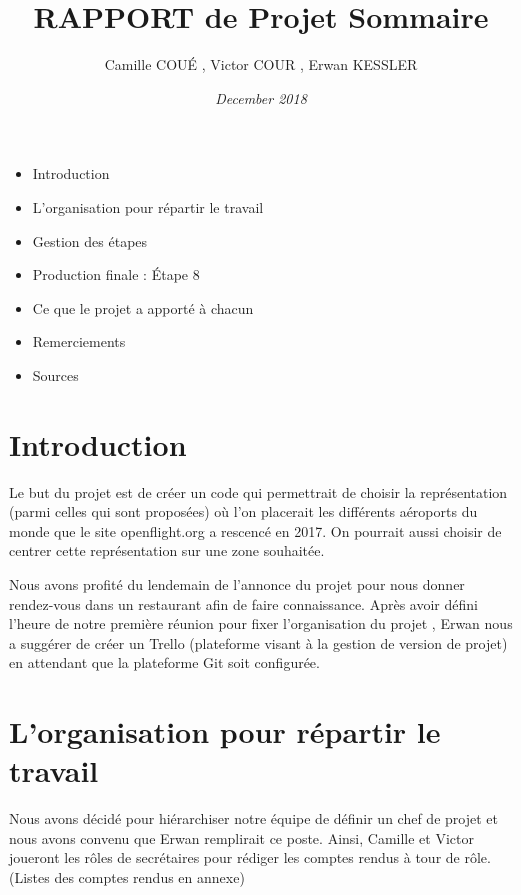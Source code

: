 \documentclass{article}
\title{\bf \color{orange} RAPPORT de Projet}
\author{\color{purple} Camille COUÉ , Victor COUR , Erwan KESSLER}
\date{\it December 2018}
\begin{document}
\maketitle


\title{\bf \Large \color{orange} Sommaire}
\begin{itemize}
    \color{purple}
    \item Introduction
    \item L'organisation pour répartir le travail 
    \item Gestion des étapes
    \item Production finale : Étape 8
    \item Ce que le projet a apporté à chacun
    \item Remerciements
    \item Sources
\end{itemize}
\color{orange} \section { Introduction }

\color{purple}

Le but du projet est de créer un code qui permettrait de choisir la représentation (parmi celles qui sont proposées) où l’on placerait les différents aéroports du monde que le site openflight.org a rescencé en 2017. On pourrait aussi choisir de centrer cette représentation sur une zone souhaitée.

\vspace{1\baselineskip}

Nous avons profité du lendemain de l’annonce du projet pour nous donner rendez-vous dans un restaurant afin de faire connaissance. Après avoir défini l’heure de notre première réunion pour fixer l’organisation du projet , Erwan nous a suggérer de créer un Trello (plateforme visant à la gestion de version de projet) en attendant que la plateforme Git soit configurée.

\vspace{1\baselineskip}

\color{orange} \section{ L'organisation pour répartir le travail }

\color{purple}

Nous avons décidé pour hiérarchiser notre équipe de définir un chef de projet et nous avons convenu que Erwan remplirait ce poste.
Ainsi, Camille et Victor joueront les rôles de secrétaires pour rédiger les comptes rendus à tour de rôle. (Listes des comptes rendus en annexe)
\end{document}
